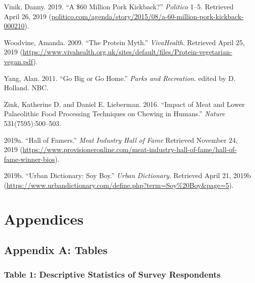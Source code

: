 \documentclass[twoside]{report}
\let\oldsection\section
\renewcommand\section{\clearpage\oldsection}
\begin{document}
\hypertarget{vinik}{Vinik, Danny. 2019. ``A \$60 Million Pork Kickback?'' \emph{Politico}
1--5. Retrieved April 26, 2019
(\href{http://politico.com/agenda/story/2015/08/a-60-million-pork-kickback-000210}{politico.com/agenda/story/2015/08/a-60-million-pork-kickback-000210}).}

\hypertarget{woodvine}{Woodvine, Amanda. 2009. ``The Protein Myth.'' \emph{VivaHealth}.
Retrieved April 25, 2019
(\url{https://www.vivahealth.org.uk/sites/default/files/Protein-vegetarian-vegan.pdf}).}

\hypertarget{yang}{Yang, Alan. 2011. ``Go Big or Go Home.'' \emph{Parks and Recreation}.
edited by D. Holland. NBC.}

\hypertarget{zink}{Zink, Katherine D. and Daniel E. Lieberman. 2016. ``Impact of Meat and
Lower Palaeolithic Food Processing Techniques on Chewing in Humans.''
\emph{Nature} 531(7595):500--503.}

\hypertarget{2019a}{2019a. ``Hall of Famers.'' \emph{Meat Industry Hall of Fame} Retrieved November 24, 2019 (\url{https://www.provisioneronline.com/meat-industry-hall-of-fame/hall-of-fame-winner-bios}).} 

\hypertarget{2019b}{2019b. ``Urban Dictionary: Soy Boy.'' \emph{Urban Dictionary}.
Retrieved April 21, 2019b
(\url{https://www.urbandictionary.com/define.php?term=Soy\%20Boy\&page=5}).}

\section{Appendices}

\hypertarget{appendix-a}{\subsection{Appendix A: Tables}}

\hypertarget{table-1}{\subsubsection[Table 1: Descriptive Statistics of \\Survey
Respondents]{Table 1: Descriptive Statistics of Survey
Respondents}}
\end{document}
